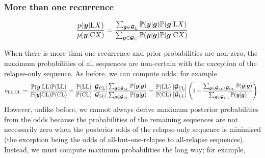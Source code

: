\documentclass{article}
\begin{document}
\subsubsection*{More than one recurrence}

$$
\frac{p(\bm{y}|\mathrm{L} X)}{p(\bm{y}|\mathrm{C} X)} = \frac{\sum_{\bm{g}\in\bm{\mathcal{G}}_{\mathrm{L}}}\mathbb{P}(\bm{y} | \bm{g})\mathbb{P}(\bm{g} | \mathrm{L} X)}{\sum_{\bm{g}\in\bm{\mathcal{G}}_{\mathrm{C}}}\mathbb{P}(\bm{y} | \bm{g})\mathbb{P}(\bm{g} | \mathrm{C} X)}
$$

When there is more than one recurrence and prior probabilities are non-zero, the maximum probabilities of all sequences are non-certain with the exception of the relapse-only sequence. As before, we can compute odds; for example
\begin{align*}
o_{\mathrm{L}\mathrm{L}:\mathrm{C}\mathrm{L}} \coloneqq
\frac{\mathbb{P}(\bm{y} | \mathrm{L}\mathrm{L})\mathbb{P}(\mathrm{L}\mathrm{L})}{\mathbb{P}(\bm{y} | \mathrm{C}\mathrm{L})\mathbb{P}(\mathrm{C}\mathrm{L})} =
\frac{\mathbb{P}(\mathrm{L}\mathrm{L})}{\mathbb{P}(\mathrm{C}\mathrm{L})}
\frac{| \bm{\mathcal{G}}_{\mathrm{C}\mathrm{L}} |}{| \bm{\mathcal{G}}_{\mathrm{L}\mathrm{L}} |} \frac{\sum_{\bm{g}\in\bm{\mathcal{G}}_{\mathrm{L}\mathrm{L}}}\mathbb{P}(\bm{y} | \bm{g})}{\sum_{\bm{g}\in\bm{\mathcal{G}}_{\mathrm{C}\mathrm{L}}}\mathbb{P}(\bm{y} | \bm{g})} = 
\frac{\mathbb{P}(\mathrm{L}\mathrm{L})}{\mathbb{P}(\mathrm{C}\mathrm{L})}
\frac{| \bm{\mathcal{G}}_{\mathrm{C}\mathrm{L}} |}{| \bm{\mathcal{G}}_{\mathrm{L}\mathrm{L}} |} \left(1 + \frac{\sum_{\bm{g}\in\bm{\mathcal{G}}_{\mathrm{L}\mathrm{L}}\setminus\bm{\mathcal{G}}_{\mathrm{C}\mathrm{L}}}\mathbb{P}(\bm{y} | \bm{g})}{\sum_{\bm{g}\in\bm{\mathcal{G}}_{\mathrm{C}\mathrm{L}}}\mathbb{P}(\bm{y} | \bm{g})}\right).
\end{align*}
However, unlike before, we cannot always derive maximum posterior probabilities from the odds because the probabilities of the remaining sequences are not necessarily zero when the posterior odds of the relapse-only sequence is minimised (the exception being the odds of all-but-one-relapse to all-relapse sequences). Instead, we must compute maximum probabilities the long way; for example,
\end{document}
